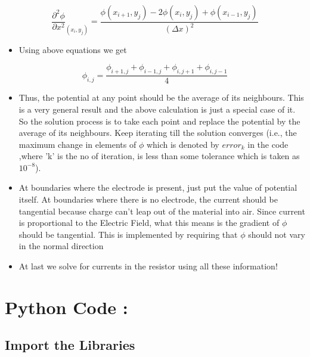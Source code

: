\documentclass[11pt]{article}
\providecommand{\tightlist}{%
      \setlength{\itemsep}{0pt}\setlength{\parskip}{0pt}}
\begin{document}
\begin{equation}
\frac{\partial^{2} \phi}{\partial x^{2}}_{(x_i,y_j)} = \frac{\phi(x_{i+1},y_j) -2\phi(x_i,y_j)+ \phi(x_{i-1},y_j)}{(\Delta x)^{2}}
 \end{equation}

\begin{itemize}
\tightlist
\item
  Using above equations we get
\end{itemize}

\begin{equation}
        \phi_{i,j} = \frac{\phi_{i+1,j} + \phi_{i-1,j} + \phi_{i,j+1} + \phi_{i,j-1}}{4} 
\end{equation}

\begin{itemize}
\tightlist
\item
  Thus, the potential at any point should be the average of its
  neighbours. This is a very general result and the above calculation is
  just a special case of it. So the solution process is to take each
  point and replace the potential by the average of its neighbours. Keep
  iterating till the solution converges (i.e., the maximum change in
  elements of \(\phi\) which is denoted by \(error_k\) in the code
  ,where 'k' is the no of iteration, is less than some tolerance which
  is taken as \(10^{-8}\)).
\item
  At boundaries where the electrode is present, just put the value of
  potential itself. At boundaries where there is no electrode, the
  current should be tangential because charge can't leap out of the
  material into air. Since current is proportional to the Electric
  Field, what this means is the gradient of \(\phi\) should be
  tangential. This is implemented by requiring that \(\phi\) should not
  vary in the normal direction
\item
  At last we solve for currents in the resistor using all these
  information!
\end{itemize}

	

	
		
    \section{Python Code :}\label{python-code}

\subsection{Import the Libraries}\label{import-the-libraries}
\end{document}
